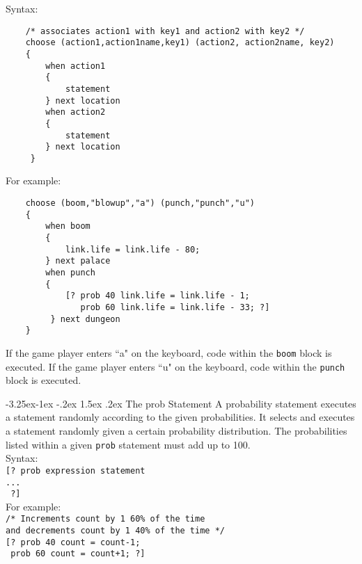 \documentclass[12pt]{article}
\makeatletter
\renewcommand\paragraph{\@startsection{paragraph}{4}{\z@}%
  {-3.25ex\@plus -1ex \@minus -.2ex}%
  {1.5ex \@plus .2ex}%
  {\normalfont\normalsize\bfseries}}
\makeatother
\begin{document}
\noindent Syntax:

\begin{verbatim}
    /* associates action1 with key1 and action2 with key2 */
    choose (action1,action1name,key1) (action2, action2name, key2) 
    {
        when action1 
        {
            statement
        } next location
        when action2 
        {
            statement
        } next location
     }
\end{verbatim}

\noindent For example: 
\begin{verbatim}
    choose (boom,"blowup","a") (punch,"punch","u") 
    {
        when boom 
        {
            link.life = link.life - 80;
        } next palace
        when punch 
        {
            [? prob 40 link.life = link.life - 1;
               prob 60 link.life = link.life - 33; ?]
         } next dungeon
    }
\end{verbatim}
If the game player enters ``a" on the keyboard, code within the \texttt{boom} block is executed.  If the game player enters ``u" on the keyboard, code within the \texttt{punch} block is executed.

\paragraph{The prob Statement}
A probability statement executes a statement randomly according to the given probabilities.  It selects and executes a statement randomly given a certain probability distribution.  The probabilities listed within a given \texttt{prob} statement must add up to 100. \\

\noindent Syntax: \\

\texttt{[? prob expression statement \\
\indent \indent \indent \texttt{... } \\
\indent \texttt{ ?]}} \\

\noindent For example: \\

\texttt{/* Increments count by 1 60\% of the time} \\
\indent \indent \texttt{and decrements count by 1 40\% of the time */} \\
\indent \texttt{[? prob 40 count = count-1;} \\
\indent \indent \texttt{   prob 60 count = count+1; ?]}
\end{document}
